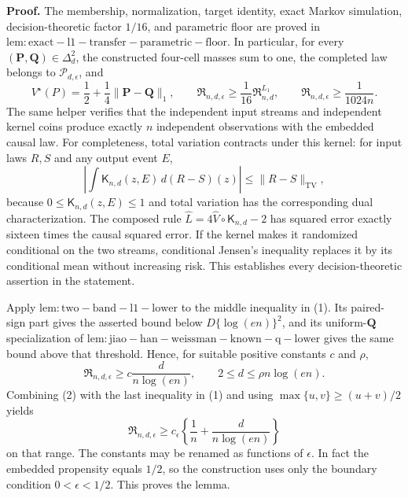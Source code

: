 \textbf{Proof.}
The membership, normalization, target identity, exact Markov simulation, decision-theoretic factor \(1/16\), and parametric floor are proved in \(\mathrm{lem:exact-l1-transfer-parametric-floor}\).  In particular, for every \((\mathbf P,\mathbf Q)\in\Delta_d^2\), the constructed four-cell masses sum to one, the completed law belongs to \(\mathcal P_{d,\epsilon}\), and
\[
 V^\star(P)=\frac12+\frac14\lVert\mathbf P-\mathbf Q\rVert_1,
 \qquad
 \mathfrak R_{n,d,\epsilon}
 \geq\frac1{16}\mathfrak R^{L_1}_{n,d},
 \qquad
 \mathfrak R_{n,d,\epsilon}\geq\frac1{1024n}.
 \tag{1}
\]
The same helper verifies that the independent input streams and independent kernel coins produce exactly \(n\) independent observations with the embedded causal law.  For completeness, total variation contracts under this kernel: for input laws \(R,S\) and any output event \(E\),
\[
 \left|\int\mathsf K_{n,d}(z,E)\,d(R-S)(z)\right|
 \leq\lVert R-S\rVert_{\mathrm{TV}},
\]
because \(0\leq\mathsf K_{n,d}(z,E)\leq1\) and total variation has the corresponding dual characterization.  The composed rule
\(\widehat L=4\widehat V\circ\mathsf K_{n,d}-2\) has squared error exactly sixteen times the causal squared error.  If the kernel makes it randomized conditional on the two streams, conditional Jensen's inequality replaces it by its conditional mean without increasing risk.  This establishes every decision-theoretic assertion in the statement.

Apply \(\mathrm{lem:two-band-l1-lower}\) to the middle inequality in (1).  Its paired-sign part gives the asserted bound below \(D\{\log(en)\}^2\), and its uniform-\(\mathbf Q\) specialization of \(\mathrm{lem:jiao-han-weissman-known-q-lower}\) gives the same bound above that threshold.  Hence, for suitable positive constants \(c\) and \(\rho\),
\[
 \mathfrak R_{n,d,\epsilon}
 \geq c\frac d{n\log(en)},
 \qquad 2\leq d\leq\rho n\log(en).
 \tag{2}
\]
Combining (2) with the last inequality in (1) and using
\(\max\{u,v\}\geq(u+v)/2\) yields
\[
 \mathfrak R_{n,d,\epsilon}
 \geq c_\epsilon\left\{
       \frac1n+\frac d{n\log(en)}
      \right\}
\]
on that range.  The constants may be renamed as functions of \(\epsilon\).  In fact the embedded propensity equals \(1/2\), so the construction uses only the boundary condition \(0<\epsilon<1/2\).  This proves the lemma.